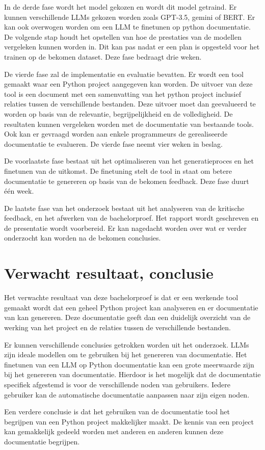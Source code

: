In de derde fase wordt het model gekozen en wordt dit model getraind. Er kunnen verschillende LLMs gekozen worden zoals GPT-3.5, gemini of BERT.
Er kan ook overwogen worden om een LLM te finetunen op python documentatie.
De volgende stap houdt het opstellen van hoe de prestaties van de modellen vergeleken kunnen worden in. 
Dit kan pas nadat er een plan is opgesteld voor het trainen op de bekomen dataset.
Deze fase bedraagt drie weken.

De vierde fase zal de implementatie en evaluatie bevatten.
Er wordt een tool gemaakt waar een Python project aangegeven kan worden. 
De uitvoer van deze tool is een document met een samenvatting van het python project inclusief relaties tussen de verschillende bestanden.
Deze uitvoer moet dan geevalueerd te worden op basis van de relevantie, begrijpelijkheid en de volledigheid. 
De resultaten kunnen vergeleken worden met de documentatie van bestaande tools.
Ook kan er gevraagd worden aan enkele programmeurs de gerealiseerde documentatie te evalueren.
De vierde fase neemt vier weken in beslag.

De voorlaatste fase bestaat uit het optimaliseren van het generatieproces en het finetunen van de uitkomst.
De finetuning stelt de tool in staat om betere documentatie te genereren op basis van de bekomen feedback.
Deze fase duurt één week.

De laatste fase van het onderzoek bestaat uit het analyseren van de kritische feedback, en het afwerken van de bachelorproef.
Het rapport wordt geschreven en de presentatie wordt voorbereid. 
Er kan nagedacht worden over wat er verder onderzocht kan worden na de bekomen conclusies.

\section{Verwacht resultaat, conclusie}%
\label{sec:verwachte_resultaten}

Het verwachte resultaat van deze bachelorproef is dat er een werkende tool gemaakt wordt dat een geheel Python project kan analyseren en er documentatie van kan genereren.
Deze documentatie geeft dan een duidelijk overzicht van de werking van het project en de relaties tussen de verschillende bestanden.

Er kunnen verschillende conclusies getrokken worden uit het onderzoek. 
LLMs zijn ideale modellen om te gebruiken bij het genereren van documentatie.
Het finetunen van een LLM op Python documentatie kan een grote meerwaarde zijn bij het genereren van documentatie.
Hierdoor is het mogelijk dat de documentatie specifiek afgestemd is voor de verschillende noden van gebruikers. Iedere gebruiker kan de automatische documentatie aanpassen naar zijn eigen noden.

Een verdere conclusie is dat het gebruiken van de documentatie tool het begrijpen van een Python project makkelijker maakt.
De kennis van een project kan gemakkelijk gedeeld worden met anderen en anderen kunnen deze documentatie begrijpen.